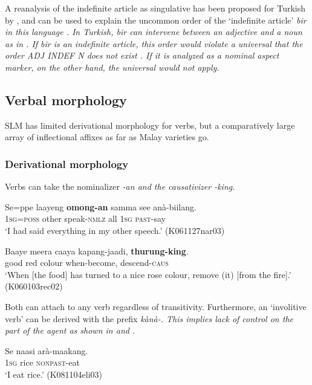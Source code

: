 A reanalysis of the indefinite article as singulative has been proposed for Turkish by \citet{Schroeder1999}, and can be used to explain the uncommon order of the `indefinite article' \em bir \em in this language \citep[319]{Rijkhoff2002}. In Turkish, \em bir \em can intervene between an adjective and a noun as in . If \em bir \em is an indefinite article, this order  would violate a universal  that the order ADJ INDEF N does not exist \citep{Greenberg1963,Hawkins1994}. If it is analyzed as a nominal aspect marker, on the other hand, the universal would not apply. 

\subsection{Verbal morphology}\label{sec:verbalmorphology}
SLM has limited derivational morphology for verbs, but a comparatively large array of inflectional affixes as far as Malay varieties go.

\subsubsection{Derivational morphology}
Verbs can take the nominalizer \em -an \em and the causativizer \em -king\em.


\ea\label{ex:constr:deriv:an1}
\gll Se=ppe laayeng \textbf{omong-an} samma see anà-biilang. \\
      1\textsc{sg}=\textsc{poss} other speak-\textsc{nmlz} all 1\textsc{sg} \textsc{past}-say \\
    `I had said everything in my other speech.' (K061127nar03)
\z

\ea\label{ex:constr:deriv:king:verb}
\gll Baaye meera caaya kapang-jaadi, \textbf{thurung-king}. \\ %
     good red colour when-become, descend-\textsc{caus}  \\
    `When  [the food] has  turned to a nice rose colour, remove (it) [from the fire].'  (K060103rec02)
\z

Both can attach to any verb regardless of transitivity. Furthermore, an `involitive verb'  can be derived with the prefix \em kànà-\em. This implies lack of control on the part of the agent as shown in  and .


\ea \label{ex:kana:nom}
\gll Se naasi arà-maakang. \\ %
     1\textsc{sg} rice \textsc{nonpast}-eat  \\
    `I eat rice.' (K081104eli03)
\z


